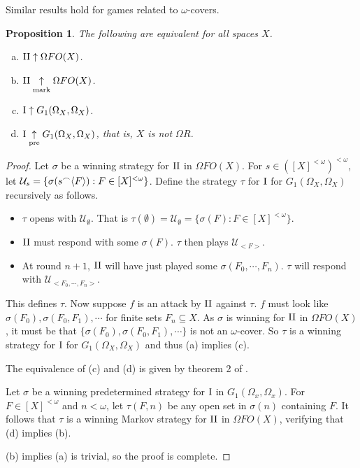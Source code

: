 \documentclass{amsart}
\theoremstyle{plain}
\newtheorem{proposition}[theorem]{Proposition}
\theoremstyle{definition}
\theoremstyle{remark}
\theoremstyle{plain}
\theoremstyle{definition}
\theoremstyle{remark}
\begin{document}
Similar results hold for games related to \(\omega\)-covers.

\begin{proposition}
The following are equivalent for all spaces \(X\).
 \begin{enumerate}[a)]
  \item \(\mathrm{II}\uparrow \Omega FO(X)\).
  \item \(\mathrm{II}\underset{\text{mark}}{\uparrow} \Omega FO(X)\).
  \item \(\mathrm{I}\uparrow G_1(\Omega_X,\Omega_X)\).
  \item \(\mathrm{I}\underset{\text{pre}}{\uparrow} G_1(\Omega_X,\Omega_X)\), that is, \(X\) is not \(\Omega R\).
 \end{enumerate}
\end{proposition}
\begin{proof}
 Let \(\sigma\) be a winning strategy for \(\mathrm{II}\) in \(\Omega FO(X)\).
 For \(s\in([X]^{<\omega})^{<\omega}\), let \(\mathcal{U}_s=\{\sigma(s{^\frown}\langle F\rangle):F\in[X]^{<\omega}\}\). 
 Define the strategy \(\tau\) for \(\mathrm{I}\) for \(G_1(\Omega_X,\Omega_X)\) recursively as follows.
 \begin{itemize}
     \item \(\tau\) opens with \(\mathcal{U}_\emptyset\). 
     That is \(\tau(\emptyset) = \mathcal{U}_\emptyset = \{\sigma(F) : F \in [X]^{<\omega}\}\).
     \item \(\mathrm{II}\) must respond with some \(\sigma(F)\). \(\tau\) then plays \(\mathcal{U}_{<F>}\).
     \item At round \(n+1\), \(\mathrm{II}\) will have just played some \(\sigma(F_0,\cdots,F_n)\). \(\tau\) will respond with \(\mathcal{U}_{<F_0,\cdots,F_n>}\).
 \end{itemize}
 This defines \(\tau\).
 Now suppose \(f\) is an attack by \(\mathrm{II}\) against \(\tau\).
 \(f\) must look like \(\sigma(F_0),\sigma(F_0,F_1),\cdots\) for finite sets \(F_n \subseteq X\).
 As \(\sigma\) is winning for \(\mathrm{II}\) in \(\Omega FO(X)\), it must be that \(\{\sigma(F_0),\sigma(F_0,F_1),\cdots\}\) is not an \(\omega\)-cover.
 So \(\tau\) is a winning strategy for \(\mathrm{I}\) for \(G_1(\Omega_X,\Omega_X)\) and thus (a) implies (c).

 The equivalence of (c) and (d) is given by theorem 2 of \cite{Scheepers1997}.

 Let \(\sigma\) be a winning predetermined strategy for \(\mathrm{I}\) in \(G_1(\Omega_x,\Omega_x)\). For \(F\in[X]^{<\omega}\) and \(n<\omega\), let \(\tau(F,n)\) be any open set in \(\sigma(n)\) containing \(F\). 
 It follows that \(\tau\) is a winning Markov strategy for \(\mathrm{II}\) in \(\Omega FO(X)\), verifying that (d) implies (b).

 (b) implies (a) is trivial, so the proof is complete.
\end{proof}
\end{document}
